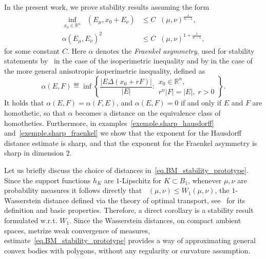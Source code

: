 \documentclass[a4paper, 10pt, twoside]{amsart}
\numberwithin{equation}{section}
\theoremstyle{plain}
\theoremstyle{definition}
\DeclareMathOperator{\dc}{\mathrm{d}_\mathrm{C}}
\DeclareMathOperator{\dH}{\mathrm{d}_\mathrm{H}}
\begin{document}
In the present work, we prove stability results assuming the form
\begin{equation}\label{eq.BM_stability_prototype}
    \begin{aligned}
        \inf_{x_0 \in \mathbb{R}^n} \dH(E_\mu, x_0 + E_\nu) 
        &\le C {\dc(\mu,\nu)}^{\frac{1}{n-1}}, \\ 
        {\alpha(E_\mu, E_\nu)}^2 
        &\leq C {\dc(\mu,\nu)}^{1 + \frac{1}{n-1}},
    \end{aligned}
\end{equation}
for some constant $C$. Here $\alpha$ denotes the \textit{Fraenkel asymmetry}, used for stability statements by~\cite{fusco2008sharp} in the case of the isoperimetric inequality and by \cite{figalli2010stability} in the case of the more general anisotropic isoperimetric inequality, defined  as 
\begin{equation}\label{eq.fraenkel_asymmetry}
    \alpha(E,F) 
    \eqdef 
    \inf
    \left\{
        \frac{|E \Delta (x_0 + rF)|}{|E|}: 
        \substack{
            \displaystyle
            x_0 \in \mathbb{R}^n,\\ 
            \displaystyle
            r^n|F| = |E|,\; r>0
        }
    \right\}.
\end{equation}
It holds that $\alpha(E,F)=\alpha(F,E)$, and $\alpha(E,F)=0$ if and only if $E$ and $F$ are homothetic, so that $\alpha$ becomes a distance on the equivalence class of homotheties. Furthermore, in examples~\ref{exemple.sharp_hausdorff} and~\ref{exemple.sharp_fraenkel} we show that the exponent for the Hausdorff distance estimate is sharp, and that the exponent for the Fraenkel asymmetry is sharp in dimension $2$.

Let us briefly discuss the choice of distances in~\eqref{eq.BM_stability_prototype}. Since the support functions $h_K$ are $1$-Lipschitz for $K \subset B_1$, whenever $\mu,\nu$ are probability measures it follows directly that $\dc(\mu,\nu) \le W_1(\mu,\nu)$, the $1$-Wasserstein distance defined via the theory of optimal transport, see~\cite{santambrogio2015optimal,ambrosio2021lectures} for its definition and basic properties. Therefore, a direct corollary is a stability result formulated w.r.t. $W_1$. Since the Wasserstein distances, on compact ambient spaces, metrize weak convergence of measures, estimate~\eqref{eq.BM_stability_prototype} provides a way of approximating general convex bodies with polygons, without any regularity or curvature assumption. 
\end{document}

